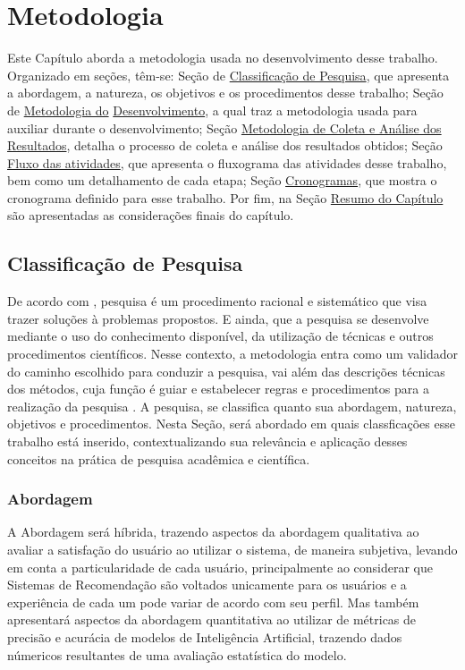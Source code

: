\chapter[Metodologia]{Metodologia}\label{chap:metodologia}
Este Capítulo aborda a metodologia usada no desenvolvimento desse trabalho. Organizado em seções, têm-se:
Seção de \hyperref[sec:classpesq]{Classificação de Pesquisa}, que apresenta a abordagem, a natureza, os objetivos
e os procedimentos desse trabalho; Seção de \hyperref[sec:metdev]{Metodologia do} \hyperref[sec:metdev]{Desenvolvimento}, a qual traz 
a metodologia usada para auxiliar durante o desenvolvimento; Seção 
\hyperref[sec:expus]{Metodologia de Coleta e Análise dos Resultados}, detalha o processo de coleta e análise
dos resultados obtidos; Seção \hyperref[sec:fluxoatv]{Fluxo das atividades}, que apresenta o fluxograma das atividades desse 
trabalho, bem como um detalhamento de cada etapa; Seção \hyperref[sec:cronog]{Cronogramas}, que mostra o cronograma definido 
para esse trabalho. Por fim, na Seção 
\hyperref[sec:resmet]{Resumo do Capítulo} são apresentadas as considerações finais
do capítulo.

\section{Classificação de Pesquisa}\label{sec:classpesq}

De acordo com , pesquisa é um procedimento racional e sistemático que visa trazer soluções à problemas propostos.
E ainda, que a pesquisa se desenvolve mediante o uso do conhecimento disponível, da utilização de técnicas e outros 
procedimentos científicos. Nesse contexto, a metodologia entra como um validador do caminho escolhido para conduzir a pesquisa,
vai além das descrições técnicas dos métodos, cuja função é guiar e estabelecer regras e procedimentos para a realização
da pesquisa \cite{gerhardt2009metodos}.
A pesquisa, se classifica quanto sua abordagem, natureza, objetivos e procedimentos. Nesta Seção, será abordado em quais 
classficações esse trabalho está inserido, contextualizando sua relevância e aplicação desses conceitos na
prática de pesquisa acadêmica e científica.

\subsection{Abordagem}\label{subsec:abord}

A Abordagem será híbrida, trazendo aspectos da abordagem qualitativa ao avaliar a satisfação do usuário ao utilizar o sistema,
de maneira subjetiva, levando em conta a particularidade de cada usuário, principalmente ao considerar que Sistemas de Recomendação
são voltados unicamente para os usuários e a experiência de cada um pode variar de acordo com seu perfil. Mas também apresentará
aspectos da abordagem quantitativa ao utilizar de métricas de precisão e acurácia de modelos de Inteligência Artificial, 
trazendo dados númericos resultantes de uma avaliação estatística do modelo.

